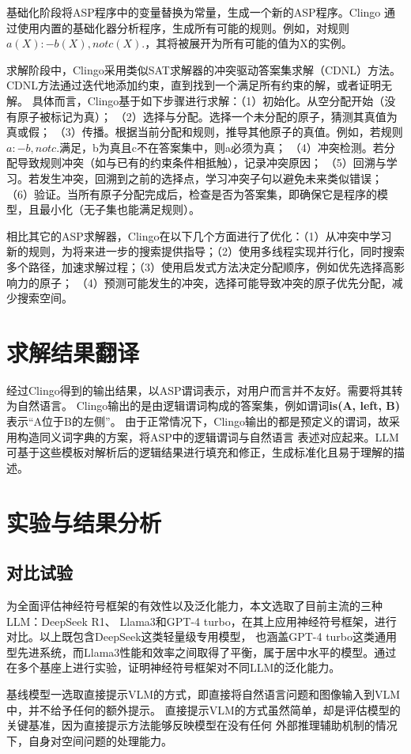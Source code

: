 基础化阶段将ASP程序中的变量替换为常量，生成一个新的ASP程序。Clingo
通过使用内置的基础化器分析程序，生成所有可能的规则。例如，对规则
$a(X) :- b(X), not c(X).$，其将被展开为所有可能的值为X的实例。

求解阶段中，Clingo采用类似SAT求解器的冲突驱动答案集求解（CDNL）方法。CDNL方法通过迭代地添加约束，直到找到一个满足所有约束的解，或者证明无解。
具体而言，Clingo基于如下步骤进行求解：（1）初始化。从空分配开始（没有原子被标记为真）；
（2）选择与分配。选择一个未分配的原子，猜测其真值为真或假；
（3）传播。根据当前分配和规则，推导其他原子的真值。例如，若规则$a :- b, not c.$满足，b为真且c不在答案集中，则a必须为真；
（4）冲突检测。若分配导致规则冲突（如与已有的约束条件相抵触），记录冲突原因；
（5）回溯与学习。若发生冲突，回溯到之前的选择点，学习冲突子句以避免未来类似错误；
（6）验证。当所有原子分配完成后，检查是否为答案集，即确保它是程序的模型，且最小化（无子集也能满足规则）。

相比其它的ASP求解器，Clingo在以下几个方面进行了优化：（1）从冲突中学习
新的规则，为将来进一步的搜索提供指导；（2）使用多线程实现并行化，同时搜索
多个路径，加速求解过程；（3）使用启发式方法决定分配顺序，例如优先选择高影响力的原子；
（4）预测可能发生的冲突，选择可能导致冲突的原子优先分配，减少搜索空间。
\section{求解结果翻译}
经过Clingo得到的输出结果，以ASP谓词表示，对用户而言并不友好。需要将其转为自然语言。
Clingo输出的是由逻辑谓词构成的答案集，例如谓词\textbf{is(A, left, B)}表示“A位于B的左侧”。
由于正常情况下，Clingo输出的都是预定义的谓词，故采用构造同义词字典的方案，将ASP中的逻辑谓词与自然语言
表述对应起来。LLM可基于这些模板对解析后的逻辑结果进行填充和修正，生成标准化且易于理解的描述。
\section{实验与结果分析}
\subsection{对比试验}
为全面评估神经符号框架的有效性以及泛化能力，本文选取了目前主流的三种LLM：DeepSeek R1、
Llama3和GPT-4 turbo，在其上应用神经符号框架，进行对比。以上既包含DeepSeek这类轻量级专用模型，
也涵盖GPT-4 turbo这类通用型先进系统，而Llama3性能和效率之间取得了平衡，属于居中水平的模型。通过
在多个基座上进行实验，证明神经符号框架对不同LLM的泛化能力。

基线模型一选取直接提示VLM的方式，即直接将自然语言问题和图像输入到VLM中，并不给予任何的额外提示。
直接提示VLM的方式虽然简单，却是评估模型的关键基准，因为直接提示方法能够反映模型在没有任何
外部推理辅助机制的情况下，自身对空间问题的处理能力。

